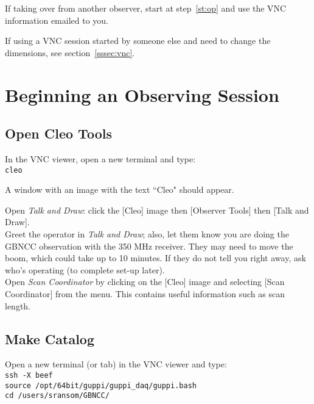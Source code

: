 \documentclass[11pt]{article}
\begin{document}
\noindent If taking over from another observer, start at step~\ref{st:op} and use the VNC information emailed to you.

\noindent If using a VNC session started by someone else and need to change the dimensions, see section~\ref{sssec:vnc}. 



\section{Beginning an Observing Session} \label{sec:begin}  %

\subsection{Open Cleo Tools}\label{ssec:cleo}  %
In the VNC viewer, open a new terminal and type: \\
\indent\texttt{cleo}

\noindent A window with an image with the text ``Cleo" should appear. 

\noindent Open \textit{Talk and Draw}: click the [Cleo] image then [Observer Tools] then [Talk and Draw].\\

\noindent Greet the operator in \textit{Talk and Draw}; also, let them know you are doing the GBNCC observation with the 350 MHz receiver.  They may need to move the boom, which could take up to 10 minutes.  If they do not tell you right away, ask who's operating (to complete set-up later).\\

\noindent Open \textit{Scan Coordinator} by clicking on the [Cleo] image and selecting [Scan Coordinator] from the menu.  This contains useful information such as scan length. 


\subsection{Make Catalog}\label{ssec:cat}  %
\noindent Open a new terminal (or tab) in the VNC viewer and type: \\
\texttt{ssh -X beef \\
source /opt/64bit/guppi/guppi\_daq/guppi.bash \\
cd /users/sransom/GBNCC/} 
\end{document}
